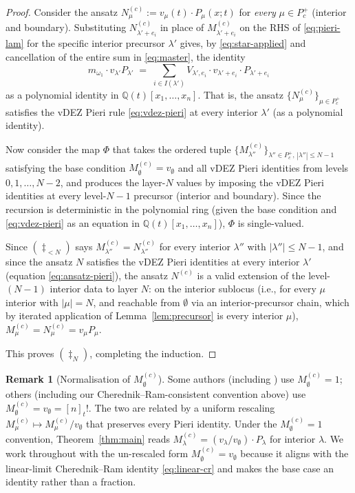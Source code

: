 \documentclass[11pt]{article}
\theoremstyle{definition}
\newtheorem{remark}[theorem]{Remark}
\newcommand{\Pcp}{P_c^+}
\newcommand{\Q}{\mathbb{Q}}
\begin{document}
\begin{proof}
Consider the ansatz $N^{(c)}_\mu := v_\mu(t) \cdot P_\mu(x;t)$ for
\emph{every} $\mu \in \Pcp$ (interior and boundary). Substituting
$N^{(c)}_{\lambda'+e_i}$ in place of $M^{(c)}_{\lambda'+e_i}$ on the RHS of
\eqref{eq:pieri-lam} for the specific interior precursor $\lambda'$ gives,
by \eqref{eq:star-applied} and cancellation of the entire sum in
\eqref{eq:master}, the identity
\begin{equation}
m_{\omega_1}\cdot v_{\lambda'} P_{\lambda'}
\;=\; \sum_{i \in I(\lambda')} V_{\lambda',e_i} \cdot v_{\lambda'+e_i} \cdot P_{\lambda' + e_i}
\label{eq:ansatz-pieri}
\end{equation}
as a polynomial identity in $\Q(t)[x_1,\ldots,x_n]$. That is, the ansatz
$\{N^{(c)}_\mu\}_{\mu \in \Pcp}$ satisfies the vDEZ Pieri rule
\eqref{eq:vdez-pieri} at every interior $\lambda'$ (as a polynomial
identity).

Now consider the map $\Phi$ that takes the ordered tuple
$\{M^{(c)}_{\lambda''}\}_{\lambda''\in \Pcp,\, |\lambda''| \le N-1}$ satisfying
the base condition $M^{(c)}_\emptyset = v_\emptyset$ and all vDEZ Pieri
identities from levels $0, 1, \ldots, N-2$, and produces the layer-$N$
values by imposing the vDEZ Pieri identities at every level-$N-1$
precursor (interior and boundary). Since the recursion is deterministic
in the polynomial ring (given the base condition and \eqref{eq:vdez-pieri}
as an equation in $\Q(t)[x_1,\ldots,x_n]$), $\Phi$ is single-valued.

Since $(\ddagger_{<N})$ says $M^{(c)}_{\lambda''} = N^{(c)}_{\lambda''}$
for every interior $\lambda''$ with $|\lambda''| \le N-1$, and since the
ansatz $N$ satisfies the vDEZ Pieri identities at every interior $\lambda'$
(equation \eqref{eq:ansatz-pieri}), the ansatz $N^{(c)}$ is a valid
extension of the level-$(N-1)$ interior data to layer $N$: on the interior
sublocus (i.e., for every $\mu$ interior with $|\mu| = N$, and reachable
from $\emptyset$ via an interior-precursor chain, which by iterated
application of Lemma~\ref{lem:precursor} is every interior $\mu$),
$M^{(c)}_\mu = N^{(c)}_\mu = v_\mu P_\mu$.

This proves $(\ddagger_N)$, completing the induction.
\end{proof}

\begin{remark}[Normalisation of $M^{(c)}_\emptyset$]
\label{rem:normalisation}
Some authors (including \cite{vDEZ2021}) use $M^{(c)}_\emptyset = 1$;
others (including our Cherednik--Ram-consistent convention above) use
$M^{(c)}_\emptyset = v_\emptyset = [n]_t!$. The two are related by a
uniform rescaling $M^{(c)}_\mu \mapsto M^{(c)}_\mu / v_\emptyset$
that preserves every Pieri identity. Under the $M^{(c)}_\emptyset = 1$
convention, Theorem~\ref{thm:main} reads
$M^{(c)}_\lambda = (v_\lambda/v_\emptyset) \cdot P_\lambda$ for interior
$\lambda$. We work throughout with the un-rescaled form
$M^{(c)}_\emptyset = v_\emptyset$ because it aligns with the linear-limit
Cherednik--Ram identity \eqref{eq:linear-cr} and makes the base case an
identity rather than a fraction.
\end{remark}
\end{document}
